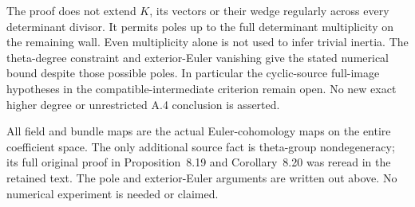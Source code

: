 \begin{remark}
\label{rem:DE-Lang-wedge-pole-scope}
The proof does not extend \(K\), its vectors or their wedge
regularly across every determinant divisor. It permits poles
up to the full determinant multiplicity on the remaining wall.
Even multiplicity alone is not used to infer trivial inertia.
The theta-degree constraint and exterior-Euler vanishing give
the stated numerical bound despite those possible poles.
In particular the cyclic-source full-image hypotheses in the
compatible-intermediate criterion remain open. No new exact
higher degree or unrestricted A.4 conclusion is asserted.

All field and bundle maps are the actual Euler-cohomology
maps on the entire coefficient space. The only additional
source fact is theta-group nondegeneracy; its full original
proof in Proposition~8.19 and Corollary~8.20 was reread in the
retained text. The pole and exterior-Euler arguments are
written out above. No numerical experiment is needed or claimed.
\end{remark}
